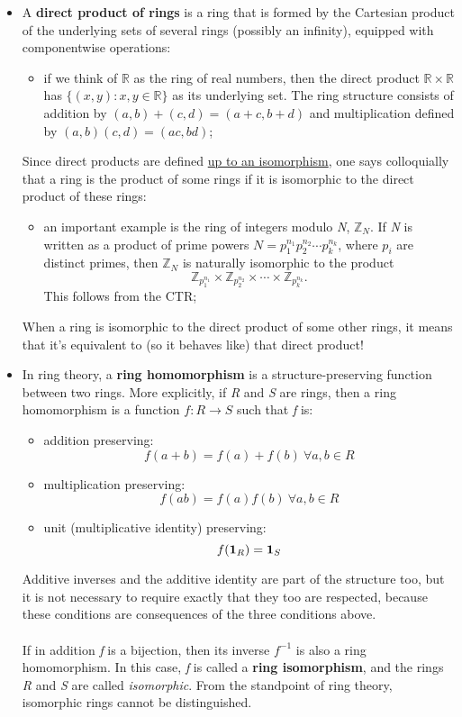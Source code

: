\begin{itemize}
    \item A \textbf{direct product of rings} is a ring that is formed by the Cartesian product of the underlying sets of several rings (possibly an infinity), equipped with componentwise operations:
    \begin{itemize}
        \item if we think of $\mathbb{R}$ as the ring of real numbers, then the direct product $\mathbb{R}\times\mathbb{R}$ has $\{(x,y):x,y\in\mathbb{R}\}$ as its underlying set. The ring structure consists of addition by $(a,b)+(c,d)=(a+c,b+d)$ and multiplication defined by $(a,b)(c,d)=(ac,bd)$;
    \end{itemize}
    Since direct products are defined \underline{up to an isomorphism}, one says colloquially that a ring is the product of some rings if it is isomorphic to the direct product of these rings:
    \begin{itemize}
        \item an important example is the ring of integers modulo \textit{N}, $\mathbb{Z}_N$. If \textit{N} is written as a product of prime powers $N=p_1^{n_1}p_2^{n_2}\cdots p_k^{n_k}$, where $p_i$ are distinct primes, then $\mathbb{Z}_N$ is naturally isomorphic to the product
        $$\mathbb{Z}_{p_1^{n_1}}\times\mathbb{Z}_{p_2^{n_2}}\times\cdots\times\mathbb{Z}_{p_k^{n_k}}.$$
        This follows from the CTR;
    \end{itemize}
    When a ring is isomorphic to the direct product of some other rings, it means that it's equivalent to (so it behaves like) that direct product!
    \item In ring theory, a \textbf{ring homomorphism} is a structure-preserving function between two rings. More explicitly, if \textit{R} and \textit{S} are rings, then a ring homomorphism is a function $f:R\rightarrow S$ such that \textit{f} is:
    \begin{itemize}
        \item addition preserving:$$f(a+b)=f(a)+f(b)\ \forall a,b\in R$$
        \item multiplication preserving:$$f(ab)=f(a)f(b)\ \forall a,b\in R$$
        \item unit (multiplicative identity) preserving:
        $$f(\textbf{1}_R)=\textbf{1}_S$$
    \end{itemize}
    Additive inverses and the additive identity are part of the structure too, but it is not necessary to require exactly that they too are respected, because these conditions are consequences of the three conditions above.\\\\
    If in addition \textit{f} is a bijection, then its inverse $f^{-1}$ is also a ring homomorphism. In this case, \textit{f} is called a \textbf{ring isomorphism}, and the rings \textit{R} and \textit{S} are called \textit{isomorphic}. From the standpoint of ring theory, isomorphic rings cannot be distinguished.
\end{itemize}

